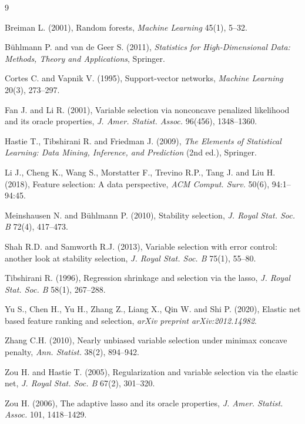 \documentclass[twoside]{article}
\begin{document}
   

\begin{thebibliography}{9}

	Breiman L. (2001), Random forests, {\it Machine Learning} 45(1), 5--32.
	
	B{\"u}hlmann P. and van de Geer S. (2011), {\it Statistics for High-Dimensional Data: Methods, Theory and Applications}, Springer.
	
	Cortes C. and Vapnik V. (1995), Support-vector networks, {\it Machine Learning} 20(3), 273--297.
	
	Fan J. and Li R. (2001), Variable selection via nonconcave penalized likelihood and its oracle properties, {\it J. Amer. Statist. Assoc.} 96(456), 1348--1360.
	
	Hastie T., Tibshirani R. and Friedman J. (2009), {\it The Elements of Statistical Learning: Data Mining, Inference, and Prediction} (2nd ed.), Springer.
	
	Li J., Cheng K., Wang S., Morstatter F., Trevino R.P., Tang J. and Liu H. (2018), Feature selection: A data perspective, {\it ACM Comput. Surv.} 50(6), 94:1--94:45.
	
	Meinshausen N. and B{\"u}hlmann P. (2010), Stability selection, {\it J. Royal Stat. Soc. B} 72(4), 417--473.
	
	Shah R.D. and Samworth R.J. (2013), Variable selection with error control: another look at stability selection, {\it J. Royal Stat. Soc. B} 75(1), 55--80.
	
	Tibshirani R. (1996), Regression shrinkage and selection via the lasso, {\it J. Royal Stat. Soc. B} 58(1), 267--288.
	
	Yu S., Chen H., Yu H., Zhang Z., Liang X., Qin W. and Shi P. (2020), Elastic net based feature ranking and selection, {\it arXiv preprint arXiv:2012.14982}.
	
	Zhang C.H. (2010), Nearly unbiased variable selection under minimax concave penalty, {\it Ann. Statist.} 38(2), 894--942.
	
	Zou H. and Hastie T. (2005), Regularization and variable selection via the elastic net, {\it J. Royal Stat. Soc. B} 67(2), 301--320.
	
	Zou H. (2006), The adaptive lasso and its oracle properties, {\it J. Amer. Statist. Assoc.} 101, 1418--1429.
	
\end{thebibliography}

 
\end{document}
